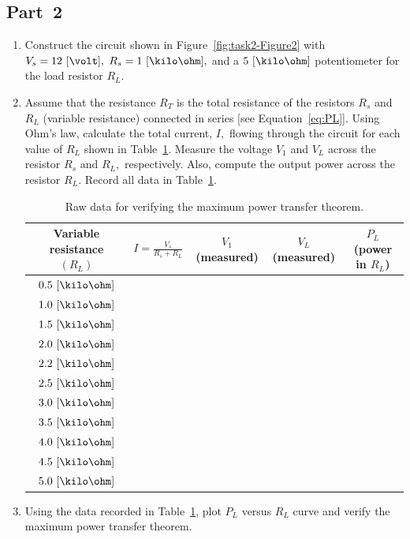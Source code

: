 \subsection{Part~2}
\label{sec:part2}
\begin{enumerate}
\item Construct the circuit shown in Figure~\ref{fig:task2-Figure2} with $V_s=12~[\volt],$ $R_s=1~[\kilo\ohm],$ and a $5~[\kilo\ohm]$ potentiometer for the load resistor $R_L.$

  
\item Assume that the resistance $R_T$ is the total resistance of the resistors
  $R_s$ and $R_L$ (variable resistance) connected in series [see Equation~\eqref{eq:PL}]. Using Ohm's law,
  calculate the total current, $I,$ flowing through the circuit for each value
  of $R_L$ shown in Table~\ref{tab:maxPowerTransferTheorem}. Measure the voltage
  $V_1$ and $V_L$ across the resistor $R_s$ and $R_L,$ respectively. Also,
  compute the output power across the resistor $R_L.$ Record all data in
  Table~\ref{tab:maxPowerTransferTheorem}.

\begin{table}[h]
    \centering
    \caption{Raw data for verifying the maximum power transfer theorem.}    
      \begin{tabular}{|c|c|c|c|c|}
        \toprule
        Variable resistance $(R_L)$ & $I =\frac{V_s}{R_s+R_L}$ & $V_1$ (measured) & $V_L$(measured) & $P_L$ (power in $R_L$)\\
        \toprule                   %
        $0.5~[\kilo\ohm]$ &&&&\\     %
        $1.0~[\kilo\ohm]$ &&&&\\     %
        $1.5~[\kilo\ohm]$ &&&&\\     %
        $2.0~[\kilo\ohm]$ &&&&\\     %
        $2.2~[\kilo\ohm]$ &&&&\\     %
        $2.5~[\kilo\ohm]$ &&&&\\     %
        $3.0~[\kilo\ohm]$ &&&&\\     %
        $3.5~[\kilo\ohm]$ &&&&\\     %
        $4.0~[\kilo\ohm]$ &&&&\\     %
        $4.5~[\kilo\ohm]$ &&&&\\     %
        $5.0~[\kilo\ohm]$ &&&&\\     %
        \bottomrule
      \end{tabular}
    \label{tab:maxPowerTransferTheorem}
\end{table}


\item Using the data recorded in Table~\ref{tab:maxPowerTransferTheorem}, plot $P_L$ versus $R_L$ curve and verify the maximum power transfer theorem. 
\end{enumerate}



